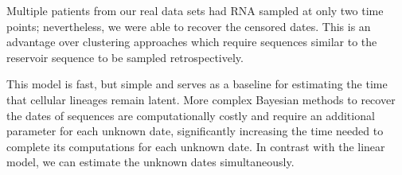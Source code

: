 \documentclass[12pt]{article}
\begin{document}





Multiple patients from our real data sets had RNA sampled at only two time points; nevertheless, we were able to recover the censored dates.
This is an advantage over clustering approaches \citep{Buzon14} which require sequences similar to the reservoir sequence to be sampled retrospectively.

This model is fast, but simple and serves as a baseline for estimating the time that cellular lineages remain latent.
More complex Bayesian methods \citep{Shapiro11} to recover the dates of sequences are computationally costly and require an additional parameter for each unknown date, significantly increasing the time needed to complete its computations for each unknown date.
In contrast with the linear model, we can estimate the unknown dates simultaneously.
\end{document}
